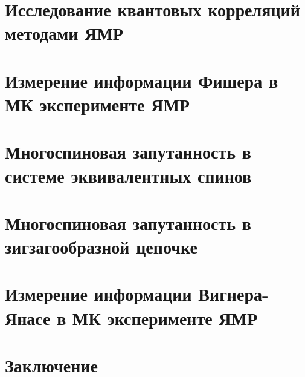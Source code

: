 \documentclass[14pt]{extreport}
\begin{document}
\chapter{Исследование квантовых корреляций методами ЯМР}
  
  
  
  
  
  


\chapter{Измерение информации Фишера в МК эксперименте ЯМР}


\chapter{Многоспиновая запутанность в системе эквивалентных спинов}


\chapter{Многоспиновая запутанность в зигзагообразной цепочке}


\chapter{Измерение информации Вигнера-Янасе в МК эксперименте ЯМР}
\label{chapter:wyi-mesuarement}


\chapter*{Заключение}


\end{document}

